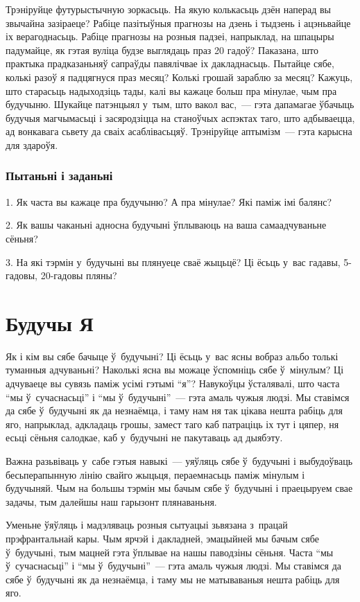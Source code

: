 Трэніруйце футурыстычную зоркасьць. На якую колькасьць дзён наперад вы звычайна зазіраеце? Рабіце пазітыўныя прагнозы на дзень і тыдзень і ацэньвайце іх верагоднасьць. Рабіце прагнозы на розныя падзеі, напрыклад, на шпацыры падумайце, як гэтая вуліца будзе выглядаць праз 20 гадоў? Паказана, што практыка прадказаньняў сапраўды павялічвае іх дакладнасьць. Пытайце сябе, колькі разоў я падцягнуся праз месяц? Колькі грошай зараблю за месяц? Кажуць, што старасьць надыходзіць тады, калі вы кажаце больш пра мінулае, чым пра будучыню. Шукайце патэнцыял у~тым, што вакол вас,~--- гэта дапамагае ўбачыць будучыя магчымасьці і засяродзіцца на станоўчых аспэктах таго, што адбываецца, ад вонкавага сьвету да сваіх асаблівасьцяў. Трэніруйце аптымізм~--- гэта карысна для здароўя.

\subsubsection{Пытаньні і заданьні}

1. Як часта вы кажаце пра будучыню? А пра мінулае? Які паміж імі балянс?

2. Як вашы чаканьні адносна будучыні ўплываюць на ваша самаадчуваньне сёньня?

3. На які тэрмін у~будучыні вы плянуеце сваё жыцьцё? Ці ёсьць у~вас гадавы, 5-гадовы, 20-гадовы пляны?


\section{Будучы Я}

Як і кім вы сябе бачыце ў~будучыні? Ці ёсьць у~вас ясны вобраз альбо толькі туманныя адчуваньні? Наколькі ясна вы можаце ўспомніць сябе ў~мінулым? Ці адчуваеце вы сувязь паміж усімі гэтымі ``я''? Навукоўцы ўсталявалі, што часта ``мы ў~сучаснасьці'' і ``мы ў~будучыні''~--- гэта амаль чужыя людзі. Мы ставімся да сябе ў~будучыні як да незнаёмца, і таму нам ня так цікава нешта рабіць для яго, напрыклад, адкладаць грошы, замест таго каб патраціць іх тут і цяпер, ня есьці сёньня салодкае, каб у~будучыні не пакутаваць ад дыябэту.

Важна разьвіваць у~сабе гэтыя навыкі~--- уяўляць сябе ў~будучыні і выбудоўваць бесьперапынную лінію свайго жыцьця, пераемнасьць паміж мінулым і будучыняй. Чым на большы тэрмін мы бачым сябе ў~будучыні і праецыруем свае задачы, тым далейшы наш гарызонт плянаваньня.

Уменьне ўяўляць і мадэляваць розныя сытуацыі зьвязана з~працай прэфрантальнай кары. Чым ярчэй і дакладней, эмацыйней мы бачым сябе ў~будучыні, тым мацней гэта ўплывае на нашы паводзіны сёньня. Часта ``мы ў~сучаснасьці'' і ``мы ў~будучыні''~--- гэта амаль чужыя людзі. Мы ставімся да сябе ў~будучыні як да незнаёмца, і таму мы не матываваныя нешта рабіць для яго.

